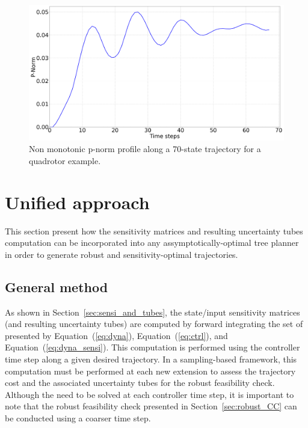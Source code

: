 \begin{figure} [t]
    \centering
    \includegraphics[width=0.7\linewidth]{figures/samp/non_monotoic.png} 
    \caption{Non monotonic p-norm profile along a 70-state trajectory for a quadrotor example.}%
    \label{fig:monotonic}%
\end{figure}

\section{Unified approach}\label{sec:unified}

This section present how the sensitivity matrices and resulting uncertainty tubes computation can be incorporated into any assymptotically-optimal tree planner in order to generate robust and sensitivity-optimal trajectories.  

\subsection{General method}\label{sec:general_method}

As shown in Section~\ref{sec:sensi_and_tubes}, the state/input sensitivity matrices (and resulting uncertainty tubes) are computed by forward integrating the set of  presented by Equation~(\ref{eq:dyna}), Equation~(\ref{eq:ctrl}), and Equation~(\ref{eq:dyna_sensi}).
This computation is performed using the controller time step along a given desired trajectory.
In a sampling-based framework, this computation must be performed at each new extension to assess the trajectory cost and the associated uncertainty tubes for the robust feasibility check.
Although the  need to be solved at each controller time step, it is important to note that the robust feasibility check presented in Section~\ref{sec:robust_CC} can be conducted using a coarser time step.

